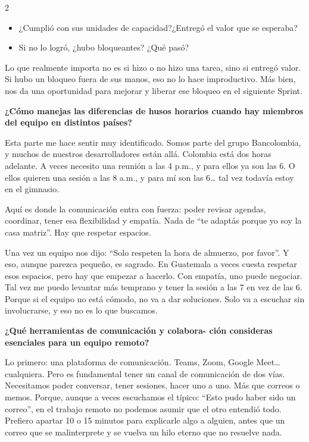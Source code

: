 \documentclass[12pt,spanish,Letterpaper,openany]{book}
\providecommand{\tightlist}{%
  \setlength{\itemsep}{0pt}\setlength{\parskip}{0pt}}
\begin{document}
\begin {multicols}{2}
\begin{itemize}
\tightlist
\item
  ¿Cumplió con sus unidades de capacidad?¿Entregó el valor que se esperaba?
\item
  Si no lo logró, ¿hubo bloqueantes? ¿Qué pasó?
\end{itemize}

Lo que realmente importa no es si hizo o no hizo una tarea, sino si entregó valor. Si hubo un bloqueo fuera de sus manos, eso no lo hace improductivo. Más bien, nos da una oportunidad para mejorar y liberar ese bloqueo en el siguiente Sprint.

\textbf{¿Cómo manejas las diferencias de husos horarios cuando hay miembros del equipo en distintos países?}

Esta parte me hace sentir muy identificado. Somos parte del grupo Bancolombia, y muchos de nuestros desarrolladores están allá. Colombia está dos horas adelante. A veces necesito una reunión a las 4 p.m., y para ellos ya son las 6. O ellos quieren una sesión a las 8 a.m., y para mí son las 6\ldots{} tal vez todavía estoy en el gimnasio.

Aquí es donde la comunicación entra con fuerza: poder revisar agendas, coordinar, tener esa flexibilidad y empatía. Nada de ``te adaptás porque yo soy la casa matriz''. Hay que respetar espacios.

Una vez un equipo nos dijo: ``Solo respeten la hora de almuerzo, por favor''. Y eso, aunque parezca pequeño, es sagrado. En Guatemala a veces cuesta respetar esos espacios, pero hay que empezar a hacerlo.
Con empatía, uno puede negociar. Tal vez me puedo levantar más temprano y tener la sesión a las 7 en vez de las 6. Porque si el equipo no está cómodo, no va a dar soluciones. Solo va a escuchar sin involucrarse, y eso no es lo que buscamos.

\textbf{¿Qué herramientas de comunicación y colabora-
ción consideras esenciales para un equipo remoto?}

Lo primero: una plataforma de comunicación. Teams, Zoom, Google Meet\ldots{} cualquiera. Pero es fundamental tener un canal de comunicación de dos vías.
Necesitamos poder conversar, tener sesiones, hacer uno a uno. Más que correos o memos. Porque, aunque a veces escuchamos el típico: ``Esto pudo haber sido un correo'', en el trabajo remoto no podemos asumir que el otro entendió todo.
Prefiero apartar 10 o 15 minutos para explicarle algo a alguien, antes que un correo que se malinterprete y se vuelva un hilo eterno que no resuelve nada.


\end{multicols}
\end{document}
